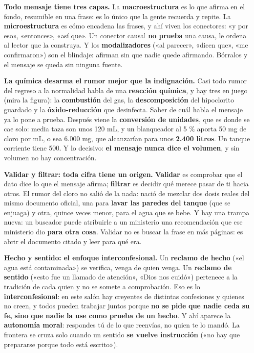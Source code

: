 \documentclass[11pt,letterpaper]{article}
\newcommand{\milcpaso}[3]{%
\Needspace{4\baselineskip}%
\begin{tcolorbox}[enhanced,colback=white,colframe=milcLinea,arc=1.5mm,boxrule=.9pt,
  left=14mm,right=4mm,top=3mm,bottom=3mm,before skip=4pt,after skip=4pt,
  fontupper=\RaggedRight,
  overlay={\node[anchor=north west,circle,fill=#2,text=white,inner sep=0pt,
    minimum size=7.4mm,font=\sffamily\bfseries\small]
    at ([xshift=3.6mm,yshift=-3.2mm]frame.north west) {#1};}]
#3
\end{tcolorbox}}
\begin{document}
\milcpaso{1}{milcTurquesa}{\textbf{Todo mensaje tiene tres capas.} La \textbf{macroestructura} es lo que afirma en el fondo, resumible en una frase: es lo único que la gente recuerda y repite. La \textbf{microestructura} es cómo encadena las frases, y ahí viven los conectores: «y por eso», «entonces», «así que». Un conector causal \textbf{no prueba} una causa, le ordena al lector que la construya. Y los \textbf{modalizadores} («al parecer», «dicen que», «me confirmaron») son el blindaje: afirman sin que nadie quede afirmando. Bórralos y el mensaje se queda sin ninguna fuente.}
\milcpaso{2}{milcTurquesa}{\textbf{La química desarma el rumor mejor que la indignación.} Casi todo rumor del regreso a la normalidad habla de una \textbf{reacción química}, y hay tres en juego (mira la figura): la \textbf{combustión} del gas, la \textbf{descomposición} del hipoclorito guardado y la \textbf{óxido-reducción} que desinfecta. Saber de cuál habla el mensaje ya lo pone a prueba. Después viene la \textbf{conversión de unidades}, que es donde se cae solo: media taza son unos 120 mL, y un blanqueador al 5 \% aporta 50 mg de cloro por mL, o sea 6.000 mg, que alcanzarían para unos \textbf{2.400 litros}. Un tanque corriente tiene 500. Y lo decisivo: \textbf{el mensaje nunca dice el volumen}, y sin volumen no hay concentración.}
\milcpaso{3}{milcTurquesa}{\textbf{Validar y filtrar: toda cifra tiene un origen.} \textbf{Validar} es comprobar que el dato dice lo que el mensaje afirma; \textbf{filtrar} es decidir qué merece pasar de ti hacia otros. El rumor del cloro no salió de la nada: nació de mezclar dos dosis reales del mismo documento oficial, una para \textbf{lavar las paredes del tanque} (que se enjuaga) y otra, quince veces menor, para el agua que se bebe. Y hay una trampa nueva: un buscador puede atribuirle a un ministerio una recomendación que ese ministerio dio \textbf{para otra cosa}. Validar no es buscar la frase en más páginas: es abrir el documento citado y leer para qué era.}
\milcpaso{4}{milcTurquesa}{\textbf{Hecho y sentido: el enfoque interconfesional.} Un \textbf{reclamo de hecho} («el agua está contaminada») se verifica, venga de quien venga. Un \textbf{reclamo de sentido} («esto fue un llamado de atención», «Dios nos cuidó») pertenece a la tradición de cada quien y no se somete a comprobación. Eso es lo \textbf{interconfesional}: en este salón hay creyentes de distintas confesiones y quienes no creen, y todos pueden trabajar juntos porque \textbf{no se pide que nadie ceda su fe, sino que nadie la use como prueba de un hecho}. Y ahí aparece la \textbf{autonomía moral}: respondes tú de lo que reenvías, no quien te lo mandó. La frontera se cruza solo cuando un sentido \textbf{se vuelve instrucción} («no hay que prepararse porque todo está escrito»).}
\end{document}
